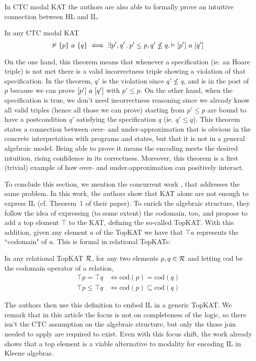 In CTC modal KAT the authors are also able to formally prove an intuitive connection between HL and IL.
\begin{theorem}\label{th:sota:falsify-il-hl-topkat}
	In any CTC modal KAT
	\[
	\nvDash \{p\}~a~\{q\} \iff \exists p', q' \,.\, p' \le p, q' \nleq q, \vDash [p']~a~[q']
	\]
\end{theorem}
On the one hand, this theorem means that whenever a specification (ie. an Hoare triple) is not met there is a valid incorrectness triple showing a violation of that specification. In the theorem, $q'$ is the violation since $q' \nleq q$, and is in the post of $p$ because we can prove $[p']~a~[q']$ with $p' \le p$.
On the other hand, when the specification is true, we don't need incorrectness reasoning since we already know all valid triples (hence all those we can prove) starting from $p' \le p$ are bound to have a postcondition $q'$ satisfying the specification $q$ (ie. $q' \le q$).
This theorem states a connection between over- and under-approximation that is obvious in the concrete interpretation with programs and states, but that it is not in a general algebraic model. Being able to prove it means the encoding meets the desired intuition, rising confidence in its correctness. Moreover, this theorem is a first (trivial) example of how over- and under-approximation can positively interact.

To conclude this section, we mention the concurrent work \cite{ZAG22}, that addresses the same problem. In this work, the authors show that KAT alone are not enough to express IL (cf. Theorem~1 of their paper). To enrich the algebraic structure, they follow the idea of expressing (to some extent) the codomain, too, and propose to add a top element $\top$ to the KAT, defining the so-called TopKAT.
With this addition, given any element $a$ of the TopKAT we have that $\top a$ represents the ``codomain" of $a$. This is formal in relational TopKATs:
\begin{prop}
	In any relational TopKAT $\mathcal{R}$, for any two elements $p, q \in \mathcal{R}$ and letting $\text{cod}$ be the codomain operator of a relation,
	\begin{align*}
		\top p = \top q   & \iff \text{cod}(p) = \text{cod}(q)         \\
		\top p \le \top q & \iff \text{cod}(p) \subseteq \text{cod}(q)
	\end{align*}
\end{prop}
The authors then use this definition to embed IL in a generic TopKAT.
We remark that in this article the focus is not on completeness of the logic, so there isn't the CTC assumption on the algebraic structure, but only the those join needed to apply  are required to exist. Even with this focus shift, the work already shows that a top element is a viable alternative to modality for encoding IL in Kleene algebras.

